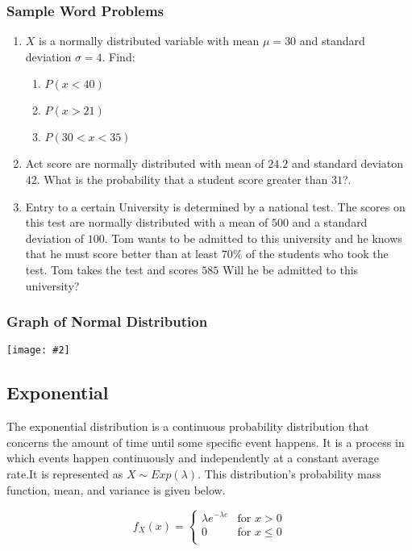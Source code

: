 \documentclass[a4paper]{article}
\newcommand*{\newincludegraphics}[2][]{
    \begin{center}
        \begin{adjustbox}{max size={\textwidth}{\textheight}}
            \texttt{[image: \#2]}
        \end{adjustbox}
    \end{center}
}
\begin{document}
    \subsubsection*{Sample Word Problems}
    \begin{enumerate}
        \item $X$ is a normally distributed variable with mean $\mu = 30$ and standard deviation $\sigma = 4$. Find:
            \begin{enumerate}
                \item $P(x < 40)$
                \item $P(x > 21)$
                \item $P(30 < x < 35)$
            \end{enumerate}
        \item Act score are normally distributed with mean of $24.2$ and standard deviaton $42$. What is the probability that a student score greater than $31$?.
        \item Entry to a certain University is determined by a national test. The scores on this test are normally distributed with a mean of $500$ and a standard deviation of $100$. Tom wants to be admitted to this university and he knows that he must score better than at least $70\%$ of the students who took the test. Tom takes the test and scores $585$ Will he be admitted to this university?
    \end{enumerate}

    \subsubsection*{Graph of Normal Distribution}
    \newincludegraphics[]{(C)-Normal_distribution_visualization.png}

    \subsection{Exponential}
    The exponential distribution is a continuous probability distribution that concerns the amount of time until some specific event happens. It is a process in which events happen continuously and independently at a constant average rate.It is represented as $X \sim Exp(\lambda)$. This distribution's probability mass function, mean, and variance is given below.

    \begin{equation}
        \label{eq:exponential_pdf}
        f_X(x) = \left\{
        \begin{array}{ll}
            {\lambda e^{-\lambda e}} & \mbox{for } x > 0 \\
            0 & \mbox{for } x \leq 0\\
        \end{array}
    \right.
    \end{equation}
\end{document}
